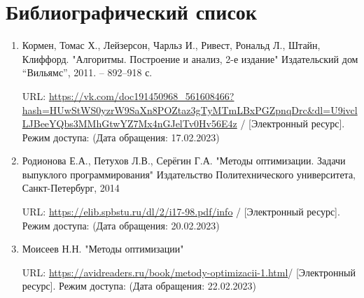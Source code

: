 \documentclass{article}
\begin{document}
	\section{Библиографический список}
	\begin{enumerate}
    \item Кормен, Томас Х., Лейзерсон, Чарльз И., Ривест, Рональд Л., Штайн, Клиффорд. "Алгоритмы. Построение и анализ, 2-е издание" Издательский дом “Вильямс”, 2011. -- 892--918 с.

    URL: \url{https://vk.com/doc191450968_561608466?hash=HUwStWS0yzrW9SaXn8POZtaz3gTyMTmLBxPGZpnqDrc&dl=U9ivclLJBeeYQbs3MMhGtwYZ7Mx4nGJelTv0Hv56E4z} / [Электронный ресурс]. Режим доступа:  (Дата обращения: 17.02.2023)

    \item Родионова Е.А., Петухов Л.В., Серёгин Г.А. "Методы оптимизации. Задачи выпуклого программирования" Издательство Политехнического университета, Санкт-Петербург, 2014

    URL: \url{https://elib.spbstu.ru/dl/2/i17-98.pdf/info} / [Электронный ресурс]. Режим доступа:  (Дата обращения: 20.02.2023)

    \item Моисеев Н.Н. "Методы оптимизации"

    URL: \url{https://avidreaders.ru/book/metody-optimizacii-1.html}/ [Электронный ресурс]. Режим доступа:  (Дата обращения: 22.02.2023)


	\end{enumerate}
\end{document}

